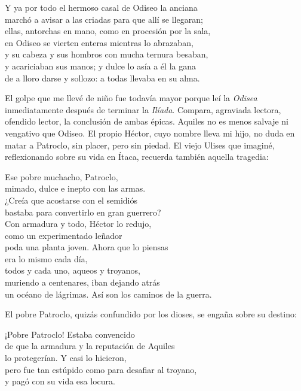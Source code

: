 \begin{versocita}
Y ya por todo el hermoso casal de Odiseo la anciana\\
marchó a avisar a las criadas para que allí se llegaran;\\
ellas, antorchas en mano, como en procesión por la sala,\\
en Odiseo se vierten enteras mientras lo abrazaban,\\
y su cabeza y sus hombros con mucha ternura besaban,\\
y acariciaban sus manos; y dulce lo asía a él la gana\\
de a lloro darse y sollozo: a todas llevaba en su alma.
\end{versocita}

El golpe que me llevé de niño fue todavía mayor porque leí la \emph{Odisea} inmediatamente después de terminar la \emph{Ilíada}. Compara, agraviada lectora, ofendido lector, la conclusión de ambas épicas. Aquiles no es menos salvaje ni vengativo que Odiseo. El propio Héctor, cuyo nombre lleva mi hijo, no duda en matar a Patroclo, sin placer, pero sin piedad. El viejo Ulises que imaginé, reflexionando sobre su vida en Ítaca, recuerda también aquella tragedia:

\begin{versopropio}
Ese pobre muchacho, Patroclo,\\
mimado, dulce e inepto con las armas.\\
¿Creía que acostarse con el semidiós\\
bastaba para convertirlo en gran guerrero?\\
Con armadura y todo, Héctor lo redujo,\\
como un experimentado leñador\\
poda una planta joven. Ahora que lo piensas\\
era lo mismo cada día,\\
todos y cada uno, aqueos y troyanos,\\
muriendo a centenares, iban dejando atrás\\
un océano de lágrimas. Así son los caminos de la guerra.
\end{versopropio}

El pobre Patroclo, quizás confundido por los dioses, se engaña sobre su destino:

\begin{versopropio}
¡Pobre Patroclo! Estaba convencido\\
de que la armadura y la reputación de Aquiles\\
lo protegerían. Y casi lo hicieron,\\
pero fue tan estúpido como para desafiar al troyano,\\
y pagó con su vida esa locura.
\end{versopropio}


